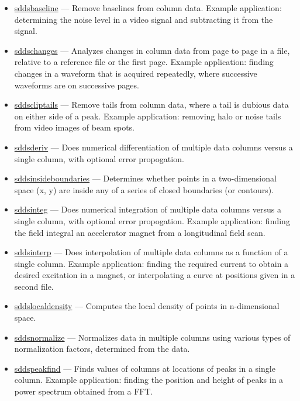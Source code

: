 \documentclass[11pt]{article}
\newcommand{\progref}[1]{\hyperref[#1]{#1}}
\begin{document}
\begin{itemize}

\item \progref{sddsbaseline} --- Remove baselines from column data.  Example
application: determining the noise level in a video signal and subtracting
it from the signal.

\item \progref{sddschanges} --- Analyzes changes in column data from
page to page in a file, relative to a reference file or the first
page.  Example application: finding changes in a waveform that is
acquired repeatedly, where successive waveforms are on successive
pages.

\item \progref{sddscliptails} --- Remove tails from column data, where a 
tail is dubious data on either side of a peak.  Example application: 
removing halo or noise tails from video images of beam spots.

\item \progref{sddsderiv} --- Does numerical differentiation of multiple data columns
versus a single column, with optional error propogation.

\item \progref{sddsinsideboundaries} --- Determines whether points in a two-dimensional space (x, y) are inside any of a
series of closed boundaries (or contours).

\item \progref{sddsinteg} --- Does numerical integration of multiple data columns versus a single column, with
optional error propogation.  Example application: finding the field integral an accelerator magnet from a
longitudinal field scan.

\item \progref{sddsinterp} --- Does interpolation of multiple data columns as a function of a single column.
Example application: finding the required current to obtain a desired excitation in a magnet, or interpolating a
curve at positions given in a second file.

\item \progref{sddslocaldensity} --- Computes the local density of points in n-dimensional space.

\item \progref{sddsnormalize} --- Normalizes data in multiple columns using various types of
normalization factors, determined from the data.  

\item \progref{sddspeakfind} --- Finds values of columns at locations of peaks in a single column.  Example
application: finding the position and height of peaks in a power spectrum obtained from a FFT.


\end{itemize}
\end{document}
